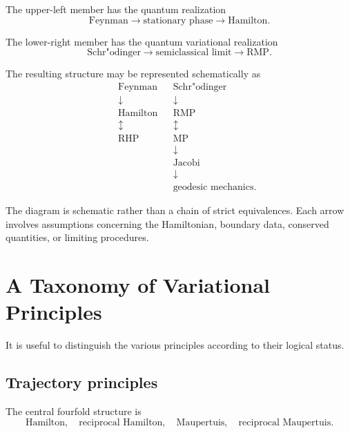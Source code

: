 The upper-left member has the quantum realization
\begin{equation}
\text{Feynman}
\longrightarrow
\text{stationary phase}
\longrightarrow
\text{Hamilton}.
\end{equation}

The lower-right member has the quantum variational realization
\begin{equation}
\text{Schr"odinger}
\longrightarrow
\text{semiclassical limit}
\longrightarrow
\text{RMP}.
\end{equation}

The resulting structure may be represented schematically as
\begin{equation}
\boxed{
\begin{array}{ccccc}
&&\text{Feynman}&&\text{Schr"odinger}\\
&&\downarrow&&\downarrow\\
&&\text{Hamilton}&&\text{RMP}\\
&&\updownarrow&&\updownarrow\\
&&\text{RHP}&&\text{MP}\\
&&&&\downarrow\\
&&&&\text{Jacobi}\\
&&&&\downarrow\\
&&&&\text{geodesic mechanics}.
\end{array}}
\end{equation}

The diagram is schematic rather than a chain of strict equivalences.  Each arrow involves assumptions concerning the Hamiltonian, boundary data, conserved quantities, or limiting procedures.

\section{A Taxonomy of Variational Principles}

It is useful to distinguish the various principles according to their logical status.

\subsection{Trajectory principles}

The central fourfold structure is
\begin{equation}
\boxed{
\text{Hamilton},\quad
\text{reciprocal Hamilton},\quad
\text{Maupertuis},\quad
\text{reciprocal Maupertuis}.
}
\end{equation}

